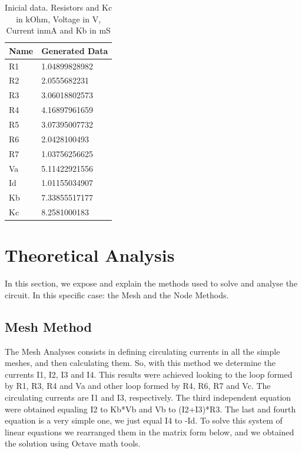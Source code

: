 \documentclass[11en, a4paper, oneside]{article}
\begin{document}
\begin{table}[ht]
\begin{center}
\begin{tabular}{|l|l|}
\hline
\textbf{Name} & \textbf{Generated Data} \\ \hline
R1        & 1.04899828982           \\ \hline
R2        & 2.0555682231            \\ \hline
R3        & 3.06018802573           \\ \hline
R4        & 4.16897961659           \\ \hline
R5        & 3.07395007732           \\ \hline
R6        & 2.0428100493            \\ \hline
R7        & 1.03756256625           \\ \hline
Va        & 5.11422921556           \\ \hline
Id        & 1.01155034907           \\ \hline
Kb        & 7.33855517177           \\ \hline
Kc        & 8.2581000183            \\ \hline
\end{tabular}
\caption{Inicial data. Resistors and Kc in kOhm, Voltage in V, Current inmA and Kb in mS}
\end{center}
\end{table}

\clearpage

\section{Theoretical Analysis}
\label{sec:analysis}

In this section, we expose and explain the methods used to solve and analyse the circuit. In this specific case: the Mesh and the Node Methods.

\subsection{Mesh Method}

The Mesh Analyses consists in defining circulating currents in all the simple meshes, and then calculating them. So, 
with this method we determine the currents I1, I2, I3 and I4. This results were achieved looking to the  loop formed by R1, R3, R4 and Va and other loop formed by R4, R6, R7 and Vc. The circulating currents are I1 and I3, respectively.  The third independent equation were obtained equaling I2 to Kb*Vb and Vb to (I2+I3)*R3. The last and fourth equation is a very simple one, we just equal I4 to -Id. To solve this system of linear equations we  rearranged them in the matrix form below, and we obtained the solution using Octave math tools.\\
\end{document}
